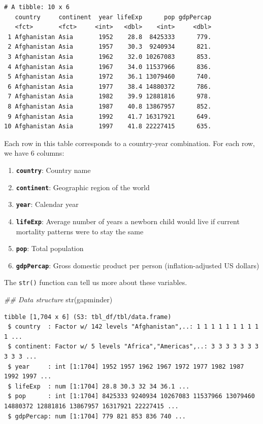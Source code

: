 \documentclass[
  letterpaper,
  DIV=11,
  numbers=noendperiod]{scrreprt}
\newenvironment{Shaded}{\begin{snugshade}}{\end{snugshade}}
\newcommand{\DocumentationTok}[1]{\textcolor[rgb]{0.37,0.37,0.37}{\textit{#1}}}
\newcommand{\FunctionTok}[1]{\textcolor[rgb]{0.28,0.35,0.67}{#1}}
\newcommand{\NormalTok}[1]{\textcolor[rgb]{0.00,0.23,0.31}{#1}}
\begin{document}
\begin{verbatim}
# A tibble: 10 x 6
   country     continent  year lifeExp      pop gdpPercap
   <fct>       <fct>     <int>   <dbl>    <int>     <dbl>
 1 Afghanistan Asia       1952    28.8  8425333      779.
 2 Afghanistan Asia       1957    30.3  9240934      821.
 3 Afghanistan Asia       1962    32.0 10267083      853.
 4 Afghanistan Asia       1967    34.0 11537966      836.
 5 Afghanistan Asia       1972    36.1 13079460      740.
 6 Afghanistan Asia       1977    38.4 14880372      786.
 7 Afghanistan Asia       1982    39.9 12881816      978.
 8 Afghanistan Asia       1987    40.8 13867957      852.
 9 Afghanistan Asia       1992    41.7 16317921      649.
10 Afghanistan Asia       1997    41.8 22227415      635.
\end{verbatim}

Each row in this table corresponds to a country-year combination. For
each row, we have 6 columns:

\begin{enumerate}
\def\labelenumi{\arabic{enumi})}
\item
  \textbf{\texttt{country}}: Country name
\item
  \textbf{\texttt{continent}}: Geographic region of the world
\item
  \textbf{\texttt{year}}: Calendar year
\item
  \textbf{\texttt{lifeExp}}: Average number of years a newborn child
  would live if current mortality patterns were to stay the same
\item
  \textbf{\texttt{pop}}: Total population
\item
  \textbf{\texttt{gdpPercap}}: Gross domestic product per person
  (inflation-adjusted US dollars)
\end{enumerate}

The \texttt{str()} function can tell us more about these variables.

\begin{Shaded}
\begin{Highlighting}[]
\DocumentationTok{\#\# Data structure}
\FunctionTok{str}\NormalTok{(gapminder)}
\end{Highlighting}
\end{Shaded}

\begin{verbatim}
tibble [1,704 x 6] (S3: tbl_df/tbl/data.frame)
 $ country  : Factor w/ 142 levels "Afghanistan",..: 1 1 1 1 1 1 1 1 1 1 ...
 $ continent: Factor w/ 5 levels "Africa","Americas",..: 3 3 3 3 3 3 3 3 3 3 ...
 $ year     : int [1:1704] 1952 1957 1962 1967 1972 1977 1982 1987 1992 1997 ...
 $ lifeExp  : num [1:1704] 28.8 30.3 32 34 36.1 ...
 $ pop      : int [1:1704] 8425333 9240934 10267083 11537966 13079460 14880372 12881816 13867957 16317921 22227415 ...
 $ gdpPercap: num [1:1704] 779 821 853 836 740 ...
\end{verbatim}
\end{document}
